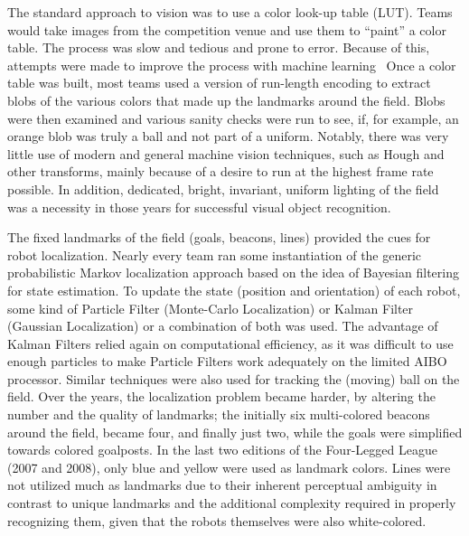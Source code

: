 \documentclass{llncs}
\begin{document}
The standard approach to vision was to use a color look-up table (LUT).
Teams would take images from the competition venue and use them to
``paint'' a color table. The process was slow and tedious and prone to error.
Because of this, attempts were made to improve the process with machine
learning~\cite{bruce-00,quinlan-04}
Once a color table was built, most teams used a version of run-length encoding
to extract blobs of the various colors that made up the landmarks around the field.
Blobs were then examined and various sanity checks were run to see, if,
for example, an orange blob was truly a ball and not part of a uniform.
Notably, there was very little use of modern and general machine vision techniques,
such as Hough and other transforms, mainly because of a desire to run at the
highest frame rate possible. In addition, dedicated, bright, invariant, uniform
lighting of the field was a necessity in those years for successful visual object recognition. 

The fixed landmarks of the field (goals, beacons, lines) provided the cues for robot localization. 
Nearly every team ran some instantiation of the generic probabilistic Markov localization approach based on the idea of Bayesian filtering for state estimation. 
To update the state (position and orientation) of each robot, some kind of Particle Filter (Monte-Carlo
Localization) or Kalman Filter (Gaussian Localization) or a combination of both was used. The advantage of Kalman Filters 
relied again on computational efficiency, as it was difficult to use enough
particles to make Particle Filters work adequately on the limited 
AIBO processor. 
Similar techniques were also used for tracking the (moving) ball on the field. 
Over the years, the localization problem became harder, by altering 
the number and the quality of landmarks; the initially six multi-colored beacons 
around the field, became four, and finally just two, while the goals were 
simplified towards colored goalposts. In the last two editions 
of the Four-Legged League (2007 and 2008), only blue and yellow were used as landmark colors. 
Lines were not utilized much as landmarks due to their inherent perceptual ambiguity 
in contrast to unique landmarks and the additional complexity required 
in properly recognizing them, given that the robots themselves were also white-colored. 
\end{document}
